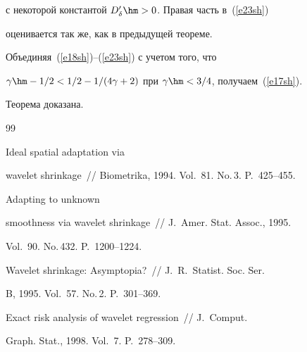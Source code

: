 с некоторой константой $D'_\delta\hm>0$. Правая часть в~(\ref{e23sh}) 

оценивается так же, как в предыдущей теореме.




Объединяя~(\ref{e18sh})--(\ref{e23sh}) с учетом того, что 

$\gamma\hm-{1}/{2}<{1}/{2}-{1}/(4\gamma+2)$ при $\gamma\hm<3/4$, получаем~(\ref{e17sh}). 

Теорема доказана.



{\small\frenchspacing

{%


\begin{thebibliography}{99}




 Ideal spatial adaptation via

wavelet shrinkage~/\!\!/ Biometrika, 1994. Vol.~81. No.\,3. P.~425--455.




 Adapting to unknown

smoothness via wavelet shrinkage~/\!\!/ J.~Amer. Stat. Assoc., 1995.

Vol.~90. No.\,432. P.~1200--1224.







Wavelet shrinkage: Asymp\-to\-pia?~/\!\!/ J.~R.~Statist. Soc. Ser.

B, 1995. Vol.~57. No.\,2. P.~301--369.




 Exact risk analysis of wavelet regression~/\!\!/ J.~Comput.

Graph. Stat., 1998. Vol.~7. P.~278--309.





\end{thebibliography}}}
